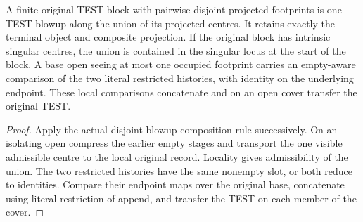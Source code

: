 \begin{theorem}
\label{hir:g8-finite-parallel-test-block-readback}
\leanok
A finite original TEST block with pairwise-disjoint projected
footprints is one TEST blowup along the union of its projected
centres. It retains exactly the terminal object and composite
projection. If the original block has intrinsic singular centres,
the union is contained in the singular locus at the start of the
block. A base open seeing at most one occupied footprint carries
an empty-aware comparison of the two literal restricted histories,
with identity on the underlying endpoint. These local comparisons
concatenate and on an open cover transfer the original TEST.
\end{theorem}
\begin{proof}
Apply the actual disjoint blowup composition rule successively.
On an isolating open compress the earlier empty stages and
transport the one visible admissible centre to the local
original record. Locality gives admissibility of the union.
The two restricted histories have the same nonempty slot,
or both reduce to identities. Compare their endpoint maps
over the original base, concatenate using literal restriction
of append, and transfer the TEST on each member of the cover.
\end{proof}

